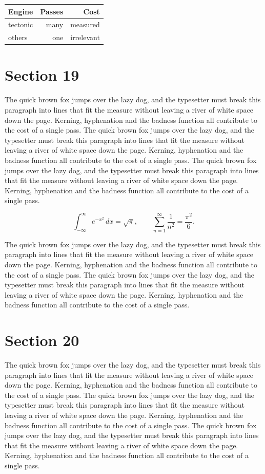 \documentclass{article}
\begin{document}
\begin{center}
\begin{tabular}{lrr}
\toprule
Engine & Passes & Cost \\
\midrule
tectonic & many & measured \\
others & one & irrelevant \\
\bottomrule
\end{tabular}
\end{center}

\section{Section 19}
The quick brown fox jumps over the lazy dog, and the typesetter must break this paragraph into lines that fit the measure without leaving a river of white space down the page. Kerning, hyphenation and the badness function all contribute to the cost of a single pass. The quick brown fox jumps over the lazy dog, and the typesetter must break this paragraph into lines that fit the measure without leaving a river of white space down the page. Kerning, hyphenation and the badness function all contribute to the cost of a single pass. The quick brown fox jumps over the lazy dog, and the typesetter must break this paragraph into lines that fit the measure without leaving a river of white space down the page. Kerning, hyphenation and the badness function all contribute to the cost of a single pass. 

\begin{equation}
\int_{-\infty}^{\infty} e^{-x^{2}}\,dx = \sqrt{\pi}, \qquad
\sum_{n=1}^{\infty} \frac{1}{n^{2}} = \frac{\pi^{2}}{6}.
\end{equation}

The quick brown fox jumps over the lazy dog, and the typesetter must break this paragraph into lines that fit the measure without leaving a river of white space down the page. Kerning, hyphenation and the badness function all contribute to the cost of a single pass. The quick brown fox jumps over the lazy dog, and the typesetter must break this paragraph into lines that fit the measure without leaving a river of white space down the page. Kerning, hyphenation and the badness function all contribute to the cost of a single pass. 
\section{Section 20}
The quick brown fox jumps over the lazy dog, and the typesetter must break this paragraph into lines that fit the measure without leaving a river of white space down the page. Kerning, hyphenation and the badness function all contribute to the cost of a single pass. The quick brown fox jumps over the lazy dog, and the typesetter must break this paragraph into lines that fit the measure without leaving a river of white space down the page. Kerning, hyphenation and the badness function all contribute to the cost of a single pass. The quick brown fox jumps over the lazy dog, and the typesetter must break this paragraph into lines that fit the measure without leaving a river of white space down the page. Kerning, hyphenation and the badness function all contribute to the cost of a single pass. 
\end{document}
